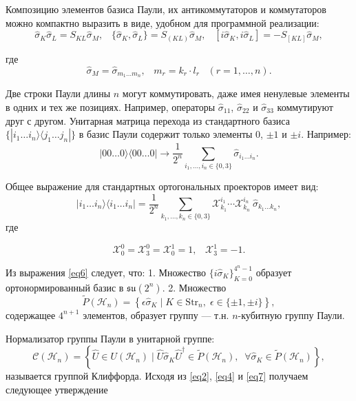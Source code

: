 \documentclass[a4paper]{report}
\begin{document}
Композицию элементов базиса Паули, их антикоммутаторов и коммутаторов можно компактно выразить в виде, удобном для программной реализации:
\begin{equation}\label{eq6}
    \hat{\sigma}_K\hat{\sigma}_L = S_{KL}\hat{\sigma}_M,\;\;\;
    \{\hat{\sigma}_K, \hat{\sigma}_L\} = S_{(KL)}\hat{\sigma}_M,\;\;\;
    [i\hat{\sigma}_K, i\hat{\sigma}_L] = -S_{[KL]}\hat{\sigma}_M,
\end{equation}

\noindent где
\begin{equation}\label{eq7}
    \hat{\sigma}_M = \hat{\sigma}_{m_1\ldots m_n}, \;\;\; m_r = k_r \cdot l_r \;\;\; (r = 1,\ldots,n).
\end{equation}

Две строки Паули длины ${n}$ могут коммутировать, даже имея ненулевые элементы в одних и тех же позициях. Например, операторы ${\hat{\sigma}_{11}}$, ${\hat{\sigma}_{22}}$ и ${\hat{\sigma}_{33}}$ коммутируют друг с другом. Унитарная матрица перехода из стандартного базиса ${\{|i_1\ldots i_n\rangle\langle j_1\ldots j_n|\}}$ в базис Паули содержит только элементы ${0}$, ${\pm 1}$ и ${\pm i}$. Например:
$$
|00\ldots0\rangle\langle00\ldots0| \rightarrow \frac{1}{2^n} \sum_{i_1,\ldots,i_n \in \{0,3\}} \hat{\sigma}_{i_1\ldots i_n}.
$$

Общее выражение для стандартных ортогональных проекторов имеет вид:
$$
|i_1\ldots i_n\rangle\langle i_1\ldots i_n| = \frac{1}{2^n} \sum_{k_1,\ldots,k_n \in \{0,3\}} \mathcal{X}^{i_1}_{k_1} \cdots \mathcal{X}^{i_n}_{k_n} \: \hat{\sigma}_{k_1\ldots k_n},
$$
\noindent где

$${
            \mathcal{X}^0_0=\mathcal{X}^0_3=\mathcal{X}^1_0=1,\;\;\;\mathcal{X}^1_3 = -1.
        }$$

Из выражения \eqref{eq6} следует, что:
1. Множество ${\{i\hat{\sigma}_K\}_{K=0}^{4^n-1}}$ образует ортонормированный базис в ${\mathfrak{su}(2^n)}$.
2. Множество
$${
    \widetilde{P}(\mathcal{H}_n) = \left\{\epsilon\hat{\sigma}_K \mid K \in \mathrm{Str}_n,\; \epsilon \in \{\pm1, \pm i\}\right\},
}$$
\noindent содержащее ${4^{n+1}}$ элементов, образует группу — т.н. ${n}$-кубитную группу Паули.

Нормализатор группы Паули в унитарной группе:
$${
    \mathcal{C}(\mathcal{H}_n) = \left\{\hat{U} \in U(\mathcal{H}_n) \mid \hat{U}\hat{\sigma}_K\hat{U}^\dagger \in \widetilde{P}(\mathcal{H}_n),\;\; \forall \hat{\sigma}_K \in \widetilde{P}(\mathcal{H}_n)\right\},
}$$
\noindent называется группой Клиффорда. Исходя из \eqref{eq2}, \eqref{eq4} и \eqref{eq7} получаем следующее утверждение
\end{document}

